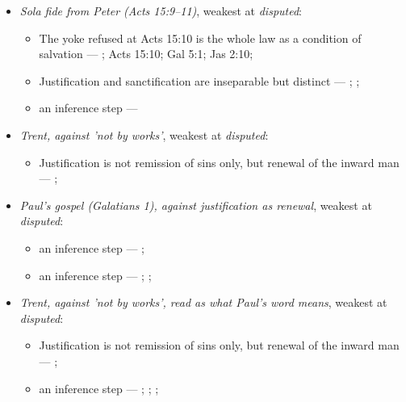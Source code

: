 \documentclass[11pt]{article}
\begin{document}
\begin{itemize}
\item \emph{Sola fide from Peter (Acts 15:9–11)}, weakest at \emph{disputed}:
\begin{itemize}
\item The yoke refused at Acts 15:10 is the whole law as a condition of salvation --- \cite[ad loc. Acts 15:10]{bruce-acts-1988}; Acts 15:10; Gal 5:1; Jas 2:10; \cite{das-paul-law-covenant-2001}
\item Justification and sanctification are inseparable but distinct --- \cite[XIII.1]{westminster-confession-1647}; \cite[XI.1]{westminster-confession-1647}; \cite[III.xi.6]{calvin-institutes-1960}
\item an inference step --- \cite[Trent, Session VI (1547), canon 9]{tanner-decrees-1990}
\end{itemize}
\item \emph{Trent, against 'not by works'}, weakest at \emph{disputed}:
\begin{itemize}
\item Justification is not remission of sins only, but renewal of the inward man --- \cite[Trent, Session VI (1547), Decree on Justification, ch. 7]{tanner-decrees-1990}; \cite[Trent, Session VI (1547), canon 11]{tanner-decrees-1990}
\end{itemize}
\item \emph{Paul's gospel (Galatians 1), against justification as renewal}, weakest at \emph{disputed}:
\begin{itemize}
\item an inference step --- \cite[ad loc. Gal 1:6]{moo-galatians-2013}; \cite[XI.1]{westminster-confession-1647}
\item an inference step --- \cite[XI.1]{westminster-confession-1647}; \cite[III.xi.2]{calvin-institutes-1960}; \cite{morris-apostolic-preaching-1965}
\end{itemize}
\item \emph{Trent, against 'not by works', read as what Paul's word means}, weakest at \emph{disputed}:
\begin{itemize}
\item Justification is not remission of sins only, but renewal of the inward man --- \cite[Trent, Session VI (1547), Decree on Justification, ch. 7]{tanner-decrees-1990}; \cite[Trent, Session VI (1547), canon 11]{tanner-decrees-1990}
\item an inference step --- \cite[Trent, Session VI (1547), Decree on Justification, ch. 8]{tanner-decrees-1990}; \cite[Trent, Session VI (1547), Decree on Justification, ch. 7]{tanner-decrees-1990}; \cite[On the Spirit and the Letter, ch. 45 (26.45)]{npnf1-05-1887}; \cite{mcgrath-iustitia-dei-2005}

\end{itemize}
\end{itemize}
\end{document}
